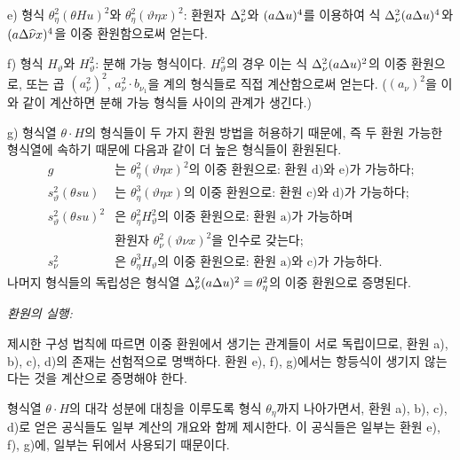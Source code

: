 e) 형식 $\theta_\eta^2(\theta Hu)^2$와 $\theta_\eta^2(\vartheta\eta x)^2$: 환원자 $\Delta_\nu^2$와 $(a\Delta u)^4$를 이용하여 식 $\Delta_\nu^2(a\Delta u)^4$와 $(a\Delta\widehat{\nu}x)^4$을 이중 환원함으로써 얻는다.

f) 형식 $H_\vartheta$와 $H_\vartheta^2$: 분해 가능 형식이다. $H_\vartheta^2$의 경우 이는 식 $\Delta_\nu^2(a\Delta u)^2$의 이중 환원으로, 또는 곱 $(a_\nu^2)^2$, $a_\nu^2\cdot b_{\nu_1}$을 계의 형식들로 직접 계산함으로써 얻는다. ($(a_\nu)^2$을 이와 같이 계산하면 분해 가능 형식들 사이의 관계가 생긴다.)

g) 형식열 $\theta\cdot H$의 형식들이 두 가지 환원 방법을 허용하기 때문에, 즉 두 환원 가능한 형식열에 속하기 때문에 다음과 같이 더 높은 형식들이 환원된다.
\[
\begin{array}{rl}
g&\text{는 }\theta_\eta^2(\vartheta\eta x)^2\text{의 이중 환원으로: 환원 d)와 e)가 가능하다;}\\[0.3em]
s_\vartheta^2(\theta s u)&\text{는 }\theta_\eta^3(\vartheta\eta x)\text{의 이중 환원으로: 환원 c)와 d)가 가능하다;}\\[0.3em]
s_\vartheta^2(\theta s u)^2&\text{은 }\theta_\eta^2H_\vartheta^2\text{의 이중 환원으로: 환원 a)가 가능하며}\\
&\text{환원자 }\theta_\nu^2(\vartheta\nu x)^2\text{을 인수로 갖는다;}\\[0.3em]
s_\nu^2&\text{은 }\theta_\eta^3H_\vartheta\text{의 이중 환원으로: 환원 a)와 c)가 가능하다.}
\end{array}
\]
나머지 형식들의 독립성은 형식열 $\Delta_\nu^2(a\Delta u)^2\equiv\theta_\eta^2$의 이중 환원으로 증명된다.

\noindent\emph{환원의 실행:}

제시한 구성 법칙에 따르면 이중 환원에서 생기는 관계들이 서로 독립이므로, 환원 a), b), c), d)의 존재는 선험적으로 명백하다. 환원 e), f), g)에서는 항등식이 생기지 않는다는 것을 계산으로 증명해야 한다.

형식열 $\theta\cdot H$의 대각 성분에 대칭을 이루도록 형식 $\theta_\eta$까지 나아가면서, 환원 a), b), c), d)로 얻은 공식들도 일부 계산의 개요와 함께 제시한다. 이 공식들은 일부는 환원 e), f), g)에, 일부는 뒤에서 사용되기 때문이다.

